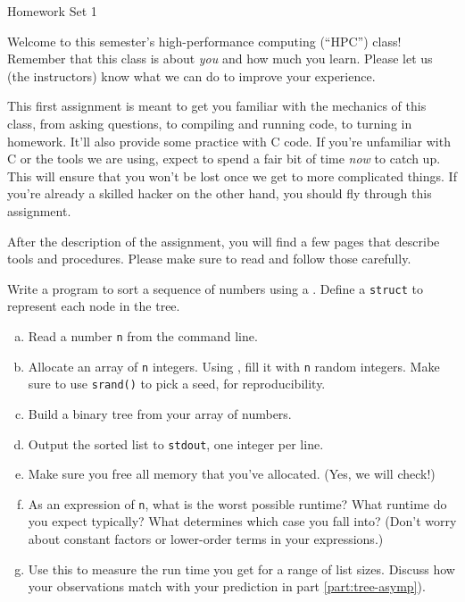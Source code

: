 \documentclass[11pt]{article}
\begin{document}
%
{Homework Set 1}

\smallskip
Welcome to this semester's high-performance computing (``HPC'') class!
Remember that this class is about \emph{you} and how much you learn.
Please let us (the instructors) know what we can do to improve your
experience.

\smallskip This first assignment is meant to get you familiar with the
mechanics of this class, from asking questions, to compiling and
running code, to turning in homework. It'll also provide some
practice with C code. If you're unfamiliar with C or the tools we are
using, expect to spend a fair bit of time \emph{now} to catch up.
This will ensure that you won't be lost once we get to more
complicated things. If you're already a skilled hacker on the other
hand, you should fly through this assignment.

\smallskip
After the description of the assignment, you will find a few pages
that describe tools and procedures. Please make sure to read and
follow those carefully.

\bigskip
{}

Write a program to sort a sequence of numbers using a
.
Define a \texttt{struct} to represent each node in
the tree.

\begin{enumerate}[a)]
\item Read a number \texttt{n} from the command line.
\item Allocate an array of \texttt{n} integers. Using
  ,
  fill it with \texttt{n} random integers. Make sure to use
  \texttt{srand()} to pick a seed, for reproducibility.
\item Build a binary tree from your array of numbers.
\item Output the sorted list to \texttt{stdout}, one integer
  per line.
\item Make sure you free all memory that you've allocated.
  (Yes, we will check!)
\item \label{part:tree-asymp}As an expression of \texttt{n}, what is the worst
possible runtime? What runtime do you expect typically?
What determines which case you fall into?
(Don't worry about constant factors or lower-order
terms in your expressions.)
\item \label{part:tree-runtime-discuss}Use this
to measure the run time you get for a range of list sizes.
Discuss how your observations match with your prediction
in part \ref{part:tree-asymp}).
\end{enumerate}
\end{document}
